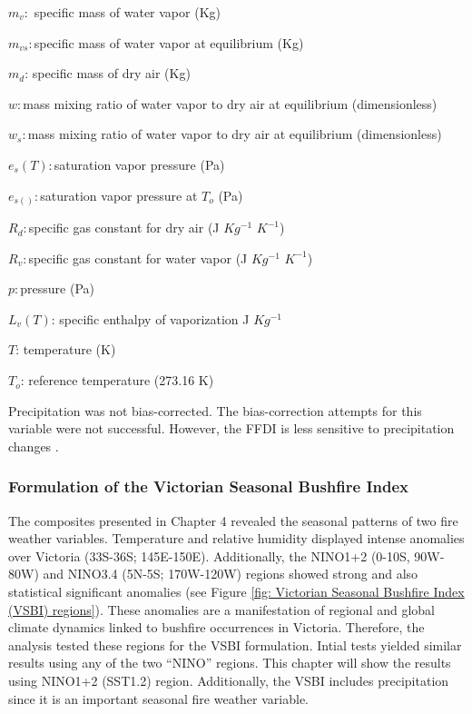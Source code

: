 $m_{v}:$ specific mass of water vapor (Kg)

$m_{vs}:$specific mass of water vapor at equilibrium (Kg)

$m_{d}$: specific mass of dry air (Kg)

$w:$mass mixing ratio of water vapor to dry air at equilibrium (dimensionless)

$w_{s}:$mass mixing ratio of water vapor to dry air at equilibrium
(dimensionless)

$e_{s}(T):$saturation vapor pressure (Pa)

$e_{s()}:$saturation vapor pressure at $T_{o}$ (Pa)

$R_{d}:$specific gas constant for dry air (J $Kg^{-1}$ $K^{-1}$)

$R_{v}:$specific gas constant for water vapor (J $Kg^{-1}$ $K^{-1}$)

$p:$pressure (Pa)

$L_{v}(T)$: specific enthalpy of vaporization J $Kg^{-1}$

$T$: temperature (K)

$T_{o}$: reference temperature (273.16 K)

Precipitation was not bias-corrected. The bias-correction attempts
for this variable were not successful. However, the FFDI is less sensitive
to precipitation changes \citep{Dowdy2009}. 


\subsubsection{Formulation of the Victorian Seasonal Bushfire Index \label{sub:Formulation-VSBI}}

The composites presented in Chapter 4 revealed the seasonal patterns
of two fire weather variables. Temperature and relative humidity displayed
intense anomalies over Victoria (33S-36S; 145E-150E). Additionally,
the NINO1+2 (0-10S, 90W-80W) and NINO3.4 (5N-5S; 170W-120W) regions
showed strong and also statistical significant anomalies (see Figure
\ref{fig: Victorian Seasonal Bushfire Index (VSBI) regions}). These
anomalies are a manifestation of regional and global climate dynamics
linked to bushfire occurrences in Victoria. Therefore, the analysis
tested these regions for the VSBI formulation. Intial tests yielded
similar results using any of the two ``NINO'' regions. This chapter
will show the results using NINO1+2 (SST1.2) region. Additionally,
the VSBI includes precipitation since it is an important seasonal
fire weather variable.

